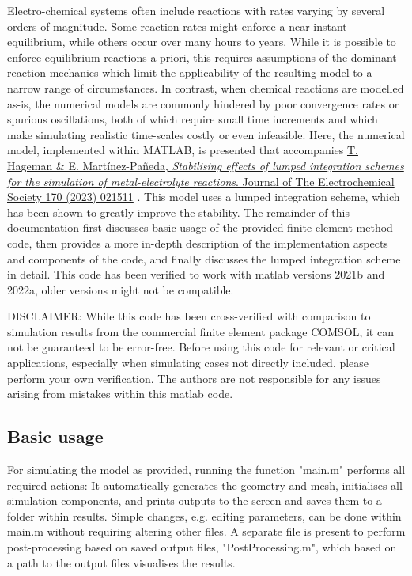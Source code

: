 \documentclass[3p]{elsarticle} %
\newcommand{\citeMe}{\href{http://www.doi.org/10.1149/1945-7111/acb971}{T. Hageman \& E. Martínez-Pañeda, \textit{Stabilising effects of lumped integration schemes for the simulation of metal-electrolyte reactions}. Journal of The Electrochemical Society 170 (2023) 021511} \citep{Hageman2023}}
\begin{document}
Electro-chemical systems often include reactions with rates varying by several orders of magnitude. Some reaction rates might enforce a near-instant equilibrium, while others occur over many hours to years. While it is possible to enforce equilibrium reactions a priori, this requires assumptions of the dominant reaction mechanics which limit the applicability of the resulting model to a narrow range of circumstances. In contrast, when chemical reactions are modelled as-is, the numerical models are commonly hindered by poor convergence rates or spurious oscillations, both of which require small time increments and which make simulating realistic time-scales costly or even infeasible. Here, the numerical model, implemented within MATLAB, is presented that accompanies \citeMe{}. This model uses a lumped integration scheme, which has been shown to greatly improve the stability. The remainder of this documentation first discusses basic usage of the provided finite element method code, then provides a more in-depth description of the implementation aspects and components of the code, and finally discusses the lumped integration scheme in detail. This code has been verified to work with matlab versions 2021b and 2022a, older versions might not be compatible. 

DISCLAIMER: While this code has been cross-verified with comparison to simulation results from the commercial finite element package COMSOL, it can not be guaranteed to be error-free. Before using this code for relevant or critical applications, especially when simulating cases not directly included, please perform your own verification. The authors are not responsible for any issues arising from mistakes within this matlab code.

\subsection{Basic usage}
For simulating the model as provided, running the function "main.m" performs all required actions: It automatically generates the geometry and mesh, initialises all simulation components, and prints outputs to the screen and saves them to a folder within results. Simple changes, e.g. editing parameters, can be done within main.m without requiring altering other files. A separate file is present to perform post-processing based on saved output files, "PostProcessing.m", which based on a path to the output files visualises the results.
\end{document}
